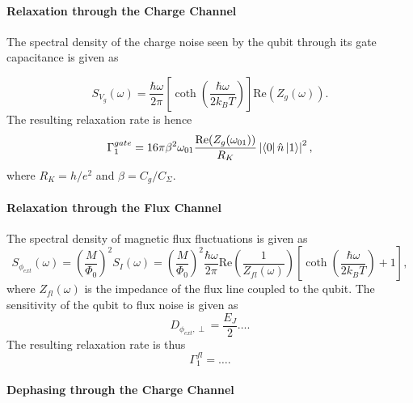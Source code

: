 \paragraph{Relaxation through the Charge Channel}

The spectral density of the charge noise seen by the qubit through its gate capacitance is given as

%
\begin{equation}
S_{V_g}(\omega) = \frac{\hbar\omega}{2\pi}\left[\coth{\left(\frac{\hbar \omega}{2 k_B T}\right)}\right]\mathrm{Re}\left(Z_g(\omega)\right). \label{eq:qubit_relaxation_svg}
\end{equation}
%
The resulting relaxation rate is hence
%
\begin{equation}
\Gamma_1^{gate} = 16\pi\beta^2\omega_{01}\frac{\mathrm{Re}(Z_g(\omega_{01}))}{R_K}\left|\left< 0 \right|\hat{n}\left| 1 \right>\right|^2,
\end{equation}
%
where $R_K=h/e^2$ and $\beta=C_g/C_\Sigma$.

\paragraph{Relaxation through the Flux Channel}

The spectral density of magnetic flux fluctuations is given as
%
\begin{equation}
S_{\phi_{ext}}(\omega) = \left(\frac{M}{\Phi_0}\right)^2 S_I(\omega) = \left(\frac{M}{\Phi_0}\right)^2\frac{\hbar\omega}{2\pi}\mathrm{Re}\left(\frac{1}{Z_{fl}(\omega)}\right)\left[\coth{\left(\frac{\hbar\omega}{2k_B T}\right)}+1\right],
\end{equation}
%
where $Z_{fl}(\omega)$ is the impedance of the flux line coupled to the qubit. The sensitivity of the qubit to flux noise is given as
%
\begin{equation}
D_{\phi_{ext},\perp} = \frac{E_J}{2}\hdots. \label{eq:flux_relaxation_sensitivity}
\end{equation}
%
The resulting relaxation rate is thus
%
\begin{equation}
\Gamma_1^{fl} = \hdots. \label{eq:flux_relaxation_rate}
\end{equation}
%
\paragraph{Dephasing through the Charge Channel}

